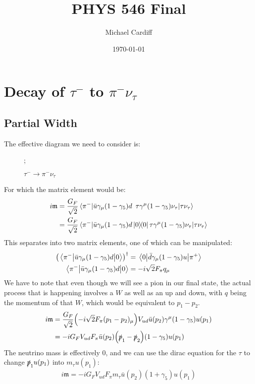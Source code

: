 \documentclass[12pt]{article}
\title{PHYS 546 Final}
\author{Michael Cardiff}
\date{\today}
\newcommand{\g}{\gamma}
\renewcommand{\u}[1]{{u(#1)}}
\newcommand{\ub}[1]{{\bar u(#1)}}
\renewcommand{\sp}{\slashed{p}}
\newcommand{\m}{\mathfrak{m}}
\begin{document}
\maketitle
\section{Decay of $\tau^-$ to $\pi^-\nu_\tau$}
\subsection{Partial Width}
The effective diagram we need to consider is:
\begin{figure}[H]
  \centering
  ;
  \caption{$\tau^-\to\pi^-\nu_\tau$}
  \label{fig:1}
\end{figure}
For which the matrix element would be:
\begin{align*}
  i\m&=\frac{G_F}{\sqrt{2}}\mel*{\pi^-}{\bar{u}\g_\mu(1-\g_5)d\enspace
    \tau\g^\mu(1-\g_5)\nu_\tau}{\tau\nu_\tau}\\
  &=\frac{G_F}{\sqrt{2}}\mel*{\pi^-}{\bar{u}\g_\mu(1-\g_5)d\dyad{0}
    \tau\g^\mu(1-\g_5)\nu_\tau}{\tau\nu_\tau}
\end{align*}
This separates into two matrix elements, one of which can be manipulated:
\begin{align*}
  \qty(\mel{\pi^-}{\bar{u}\g_\mu(1-\g_5)d}{0})^\dag
  &=\mel{0}{\bar{d}\g_\mu(1-\g_5)u}{\pi^+}\\
  \mel{\pi^-}{\bar{u}\g_\mu(1-\g_5)d}{0}&=-i\sqrt{2}F_\pi q_\mu
\end{align*}
We have to note that even though we will see a pion in our final state, the actual process that is happening involves a $W$ as well as an up and down, with $q$ being the momentum of that $W$, which would be equivalent to $p_1-p_2$. 
\begin{align*}
  i\m&=\frac{G_F}{\sqrt{2}}\qty(-i\sqrt{2}F_\pi(p_1-p_2)_\mu) V_{ud}
  \ub{p_2}\g^\mu(1-\g_5)\u{p_1}\\
  &=-iG_FV_{ud}F_\pi\ub{p_2}\qty(\sp_1-\sp_2)(1-\g_5)\u{p_1}
\end{align*}
The neutrino mass is effectively $0$, and we can use the dirac equation for the $\tau$ to change $\sp_1\u{p_1}$ into $m_\tau\u{p_1}$:
\begin{align*}
  i\m=-iG_FV_{ud}F_\pi m_\tau\ub{p_2}(1+\g_5)\u{p_1}
\end{align*}
\end{document}
